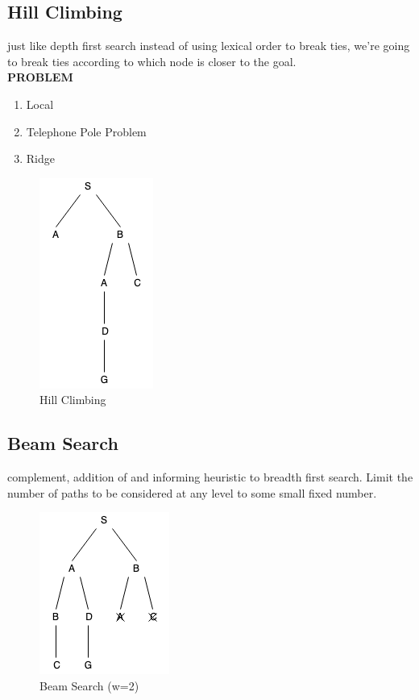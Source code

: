 \documentclass[12pt]{book}
\begin{document}
\subsection{Hill Climbing}
\indent just like depth first search instead of using lexical order to break ties, we're going to break ties according to which node is closer to the goal.\\
\newline
\indent \textbf{PROBLEM}
\begin{enumerate}
	\item Local
	\item Telephone Pole Problem
	\item Ridge
\end{enumerate}
\begin{figure}[ht]
	\centering
	\includegraphics[scale=1]{Figure/Figure4_3.png}
	\caption{Hill Climbing}
\end{figure}
\newpage
\subsection{Beam Search}
\indent complement, addition of and informing heuristic to breadth first search. Limit the number of paths to be considered at any level to some small fixed number.\\
\begin{figure}[ht]
	\centering
	\includegraphics[scale=0.8]{Figure/Figure4_4.png}
	\caption{Beam Search (w=2)}
\end{figure}
\end{document}
